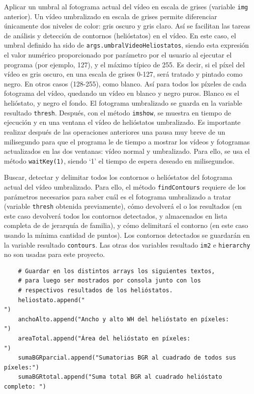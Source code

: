 Aplicar un umbral al fotograma actual del vídeo en escala de grises (variable \verb|img| anterior). Un vídeo umbralizado en escala de grises permite diferenciar únicamente dos niveles de color: gris oscuro y gris claro. Así se facilitan las tareas de análisis y detección de contornos (helióstatos) en el vídeo. En este caso, el umbral definido ha sido de \verb|args.umbralVideoHeliostatos|, siendo esta expresión el valor numérico proporcionado por parámetro por el usuario al ejecutar el programa (por ejemplo, 127), y el máximo típico de 255. Es decir, si el píxel del vídeo es gris oscuro, en una escala de grises 0-127, será tratado y pintado como negro. En otros casos (128-255), como blanco. Así para todos los píxeles de cada fotograma del vídeo, quedando un vídeo en blanco y negro puros. Blanco es el helióstato, y negro el fondo. El fotograma umbralizado se guarda en la variable resultado \verb|thresh|. Después, con el método \verb|imshow|, se muestra en tiempo de ejecución y en una ventana el vídeo de helióstatos umbralizado. Es importante realizar después de las operaciones anteriores una pausa muy breve de un milisegundo para que el programa le de tiempo a mostrar los vídeos y fotogramas actualizados en las dos ventanas: vídeo normal y umbralizado. Para ello, se usa el método \verb|waitKey(1)|, siendo ‘1’ el tiempo de espera deseado en milisegundos.

Buscar, detectar y delimitar todos los contornos o helióstatos del fotograma actual del vídeo umbralizado. Para ello, el método \verb|findContours| requiere de los parámetros necesarios para saber cuál es el fotograma umbralizado a tratar (variable \verb|thresh| obtenida previamente), cómo devolverá el o los resultados (en este caso devolverá todos los contornos detectados, y almacenados en lista completa de de jerarquía de familia), y cómo delimitará el contorno (en este caso usando la mínima cantidad de puntos). Los contornos detectados se guardarán en la variable resultado \verb|contours|. Las otras dos variables resultado \verb|im2| e \verb|hierarchy| no son usadas para este proyecto.\\[20pt]

\begin{lstlisting}
	# Guardar en los distintos arrays los siguientes textos,
	# para luego ser mostrados por consola junto con los
	# respectivos resultados de los helióstatos.
    heliostato.append("                                               ")
    anchoAlto.append("Ancho y alto WH del helióstato en píxeles:      ")
    areaTotal.append("Área del helióstato en píxeles:                 ")
    sumaBGRparcial.append("Sumatorias BGR al cuadrado de todos sus píxeles:")
    sumaBGRtotal.append("Suma total BGR al cuadrado helióstato completo: ")
\end{lstlisting}
    
